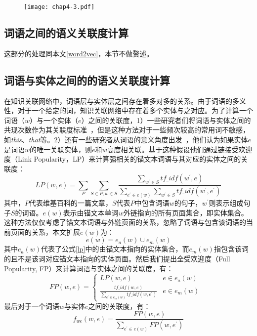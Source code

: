 \begin{figure}[!ht]
    \centerline{\texttt{[image: chap4-3.pdf]}}
    \label{chap4-3}
\end{figure}

\subsection{词语之间的语义关联度计算}
\label{dbpedia_word2vec}
这部分的处理同本文\ref{word2vec}，本节不做赘述。

\subsection{词语与实体之间的的语义关联度计算}
在知识关联网络中，词语层与实体层之间存在着多对多的关系。由于词语的多义性，对于一个给定的词，知识关联网络中存在着多个实体与之对应。为了计算一个词语（$w$）与一个实体（$e$）之间的关联度，1）一些研究者们将词语与实体之间的共现次数作为其关联度标准~\cite{aaai/Pirro12}，但是这种方法对于一些频次较高的常用词不敏感，如\emph{this}、\emph{that}等。2）还有一些研究者从词语的意义角度出发~\cite{aaai/GongXH18}，他们认为如果实体$e$是词语$w$的唯一关联实体，则$e$和$w$高度相关联。基于这种假设他们通过链接受欢迎度（Link Popularity，LP）来计算强相关的锚文本词语与其对应的实体之间的关联度：
\begin{equation}
    \label{lp}
    LP(w, e) = \sum_{P}^{ }\sum_{S \in P, w \in S}^{ } \frac{\sum_{w^{'} \in S}^{ }tf\_idf(w^{'},e)}
    {\sum_{e^{'} \in e(w)}^{ }\sum_{w^{'} \in S}^{ }tf\_idf(w^{'}, e^{'})}
\end{equation}
\noindent 其中，$P$代表维基百科的一篇文章，$S$代表$P$中包含词语$w$的句子，$w^{'}$则表示组成句子$S$的词语。$e(w)$表示由锚文本单词$w$外链指向的所有页面集合，即实体集合。这种方法仅仅考虑了锚文本词语与外链页面的关系，忽略了词语与包含该词语的当前页面的关系，本文扩展$e(w)$为：
\begin{equation}
    \label{entities-set}
    e(w) = e_{a}(w) \cup e_{m}(w)
\end{equation}
\noindent 其中$e_{a}(w)$代表了公式\ref{lp}中的由锚文本指向的实体集合，而$e_{m}(w)$指包含该词的且不是该词对应锚文本指向的实体页面。然后我们提出全受欢迎度（Full Popularity, FP）来计算词语与实体之间的关联度，有：
\begin{equation}
    \label{fp}
    FP(w,e) = \left\{\begin{matrix}
        LP(w,e) & e \in e_{a}(w) & \\
        \frac{tf\_idf(w,e)}{\sum_{e^{'} \in e_m(w)}^{ }tf\_idf(w,e^{'})} & e \in e_{m}(w) &
        \end{matrix}\right.
\end{equation}
\noindent 最后对于一个词语$w$与实体$e$之间的关联度，有：
\begin{equation}
    \label{f_we}
    f_{we}(w, e) = \frac{FP(w, e)}{\sum_{e^{'} \in e(w)}^{ }FP(w, e^{'})}
\end{equation}


